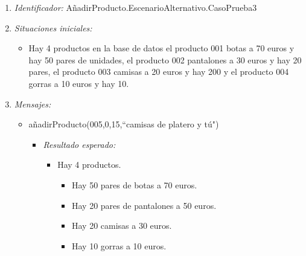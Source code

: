 \begin{enumerate}
\item {\it Identificador:} AñadirProducto.EscenarioAlternativo.CasoPrueba3
\item {\it Situaciones iniciales:}
  \begin{itemize}
  \item Hay 4 productos en la base de datos el producto 001 botas a 70 euros y hay 50 pares de unidades, el producto 002 pantalones a 30 euros y hay 20 pares, el producto 003 camisas a 20 euros y hay 200 y el producto 004 gorras a 10 euros y hay 10.
  \end{itemize}
\item {\it Mensajes:}
  \begin{itemize}
  \item añadirProducto(005,0,15,``camisas de platero y tú")
    \begin{itemize}
    \item {\it Resultado esperado:}
      \begin{itemize}
      \item Hay 4 productos.
        \begin{itemize}
        \item Hay 50 pares de botas a 70 euros.
        \item Hay 20 pares de pantalones a 50 euros.
        \item Hay 20 camisas a 30 euros.
        \item Hay 10 gorras a 10 euros.
        \end{itemize}
      \end{itemize}
    \end{itemize}
  \end{itemize}



\end{enumerate}


